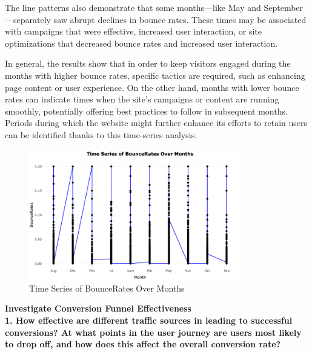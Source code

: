 \documentclass[12pt]{article}
\begin{document}
The line patterns also demonstrate that some months—like May and September—separately saw abrupt declines in bounce rates. These times may be associated with campaigns that were effective, increased user interaction, or site optimizations that decreased bounce rates and increased user interaction.


In general, the results show that in order to keep visitors engaged during the months with higher bounce rates, specific tactics are required, such as enhancing page content or user experience. On the other hand, months with lower bounce rates can indicate times when the site's campaigns or content are running smoothly, potentially offering best practices to follow in subsequent months. Periods during which the website might further enhance its efforts to retain users can be identified thanks to this time-series analysis.
\begin{figure}[h]
    \centering
    \includegraphics[width=0.82\textwidth]{Time Series of BounceRates Over Months.png}  
    \caption{Time Series of BounceRates Over Months}
\end{figure}
\vspace{0.5cm}

\newpage




\vspace{0.5cm}


\textbf{Investigate Conversion Funnel Effectiveness}\\

\textbf{1. How effective are different traffic sources in leading to successful conversions? At what points in the user journey are users most likely to drop off, and how does this affect the overall conversion rate?} \\[5pt] %
\end{document}
